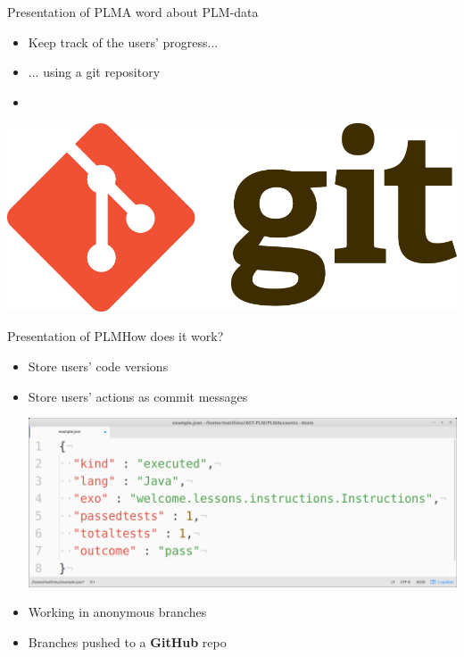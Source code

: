 \documentclass{beamer}
\begin{document}
\begin{frame}{Presentation of PLM}{A word about PLM-data}
  \begin{itemize}
  \item { 
    Keep track of the users' progress...
    \pause
  }
  \item ... using a git repository
  \item[~]
  \end{itemize}
  \begin{center}
    \includegraphics[scale=0.1]{img/git.png}
  \end{center}
\end{frame}

\begin{frame}{Presentation of PLM}{How does it work?}
  \begin{itemize}
  \item { 
    Store users' code versions
    \pause
  }
  \item {
    Store users' actions as commit messages
    \begin{center}
      \includegraphics[scale=0.2]{img/commit.png}
    \end{center}
  }
  \item {
    Working in anonymous branches
  }
  \item {
    Branches pushed to a \textbf{GitHub} repo
  }
  \end{itemize}
\end{frame}
\end{document}
